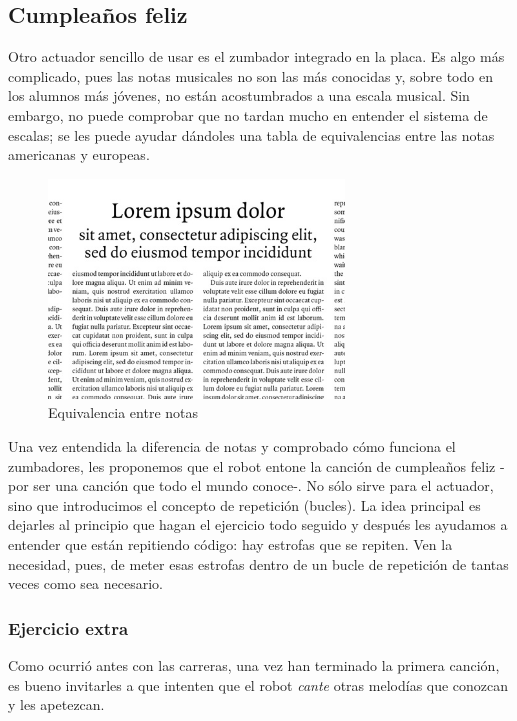\subsection{Cumpleaños feliz}\label{cumple}
Otro actuador sencillo de usar es el zumbador integrado en la placa. Es algo más complicado, pues las notas musicales no son las más conocidas y, sobre todo en los alumnos más jóvenes, no están acostumbrados a una escala musical. Sin embargo, no puede comprobar que no tardan mucho en entender el sistema de escalas; se les puede ayudar dándoles una tabla de equivalencias entre las notas americanas y europeas. 
\begin{figure}[H]
	\centering
	\includegraphics[width=0.7\textwidth]{img/lorem.jpg}
	\caption{Equivalencia entre notas}	
\end{figure}
Una vez entendida la diferencia de notas y comprobado cómo funciona el zumbadores, les proponemos que el robot entone la canción de cumpleaños feliz -por ser una canción que todo el mundo conoce-. No sólo sirve para el actuador, sino que introducimos el concepto de repetición (bucles). La idea principal es dejarles al principio que hagan el ejercicio todo seguido y después les ayudamos a entender que están repitiendo código: hay estrofas que se repiten. Ven la necesidad, pues, de meter esas estrofas dentro de un bucle de repetición de tantas veces como sea necesario.\\
\subsubsection{Ejercicio extra}
Como ocurrió antes con las carreras, una vez han terminado la primera canción, es bueno invitarles a que intenten que el robot \textit{cante} otras melodías que conozcan y les apetezcan. 
